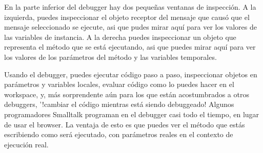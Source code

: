 \documentclass[a4paper,10pt,twoside]{book}
\begin{document}
{%
En la parte inferior del debugger hay dos pequeñas ventanas de inspecci\'on. A la izquierda, puedes inspeccionar el objeto receptor del mensaje que caus\'o que el mensaje seleccionado se ejecute, asi que pudes mirar aqu\'i para ver los valores de las variables de instancia.
A la derecha puedes inspeccionar un objeto que representa el m\'etodo que se est\'a ejecutando, asi que puedes mirar aqu\'i para ver los valores de los par\'ametros del m\'etodo y las variables temporales.


Usando el debugger, puedes ejecutar c\'odigo paso a paso, inspeccionar objetos en par\'ametros y variables locales, evaluar c\'odigo como lo puedes hacer en el workspace, y, m\'as sorprendente a\'un para los que est\'an acostumbrados a otros debuggers, '!cambiar el c\'odigo mientras est\'a siendo debuggeado! Algunos programadores Smalltalk programan en el debugger casi todo el tiempo, en lugar de usar el browser. La ventaja de esto es que puedes ver el m\'etodo que est\'as escribiendo como ser\'a ejecutado, con par\'ametros reales en el contexto de ejecuci\'on real.

}
\end{document}
